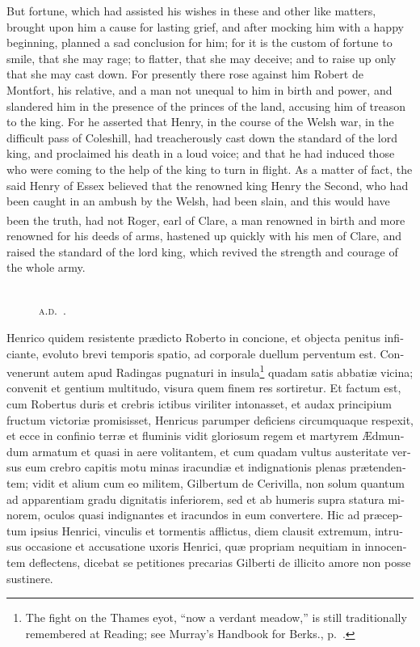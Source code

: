 \documentclass{book}
\newcounter{engnote}
\newcommand{\engnotenum}{\textsuperscript{\arabic{engnote}\stepcounter{engnote}}}
\newcommand{\blockhead}[4][]{
\begin{figure}
\centering
\vspace{#4}
\parbox{2.75cm}{\begin{center}\footnotesize \color{BrickRed} \emph{#2}\\ #1 \end{center}}
\end{figure}
}
\begin{document}
\begin{paracol}{2}
\begin{otherlanguage}{latin}
\end{otherlanguage}

\switchcolumn

But fortune, which had assisted his wishes in these and other like matters, brought upon him a cause for lasting grief, and after mocking him with a happy beginning, planned a sad conclusion for him; for it is the custom of fortune to smile, that she may rage; to flatter, that she may deceive; and to raise up only that she may cast down. For presently there rose against him Robert de Montfort, his relative, and a man not unequal to him in birth and power, and slandered him in the presence of the princes of the land, accusing him of treason to the king. For he asserted that Henry, in the course of the Welsh war, in the difficult pass of Coleshill, had treacherously cast down the standard of the lord king, and proclaimed his death in a loud voice; and that he had induced those who were coming to the help of the king to turn in flight. As a matter of fact, the said Henry of Essex believed that the renowned king Henry the Second, who had been caught in an ambush by the Welsh, had been slain, and this would have been the truth, had not Roger, earl of Clare,\engnotenum{} a man renowned in birth and more renowned for his deeds of arms, hastened up quickly with his men of Clare, and raised the standard of the lord king, which revived the strength and courage of the whole army.

\switchcolumn*

\begin{otherlanguage}{latin}
\blockhead[\textsc{a.d}.\ .]{}{2}{-0.35cm}
Henrico quidem resistente pr\ae{}dicto Roberto in concione, et objecta penitus inficiante, evoluto brevi temporis spatio, ad corporale duellum perventum est. Convenerunt autem apud Radingas pugnaturi in insula\footnote[\textdagger]{The fight on the Thames eyot, ``now a verdant meadow,'' is still traditionally remembered at Reading; see Murray's Handbook for Berks., p.\ .} quadam satis abbati\ae{} vicina; convenit et gentium multitudo, visura quem finem res sortiretur. Et factum est, cum Robertus duris et crebris ictibus viriliter intonasset, et audax principium fructum victori\ae{} promisisset, Henricus parumper deficiens circumquaque respexit, et ecce in confinio terr\ae{} et fluminis vidit gloriosum regem et martyrem \AE{}dmundum armatum et quasi in aere volitantem, et cum quadam vultus austeritate versus eum crebro capitis motu minas iracundi\ae{} et indignationis plenas pr\ae{}tendentem; vidit et alium cum eo militem, Gilbertum de Cerivilla, non solum quantum ad apparentiam gradu dignitatis inferiorem, sed et ab humeris supra statura minorem, oculos quasi indignantes et iracundos in eum convertere. Hic ad pr\ae{}ceptum ipsius Henrici, vinculis et tormentis afflictus, diem clausit extremum, intrusus occasione et accusatione uxoris Henrici, qu\ae{} propriam nequitiam in innocentem deflectens, dicebat se petitiones precarias Gilberti de illicito amore non posse sustinere. 


\end{otherlanguage}
\end{paracol}
\end{document}

